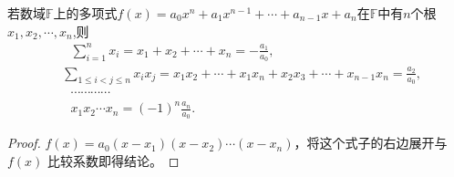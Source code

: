 \documentclass[../../main.tex]{subfiles}%
\begin{document}
\begin{theorem}[Vieta定理]\label{theorem:Vieta定理}
若数域\(\mathbb{F}\)上的多项式\(f(x)=a_0x^n + a_1x^{n - 1}+\cdots + a_{n - 1}x + a_n\)在\(\mathbb{F}\)中有\(n\)个根\(x_1,x_2,\cdots,x_n\),则
\begin{align*}
&\,\,\,\, \sum_{i=1}^n{x_i}=x_1+x_2+\cdots +x_n=-\frac{a_1}{a_0},
\\
&\sum_{1\leqslant i<j\leqslant n}{x_ix_j}=x_1x_2+\cdots +x_1x_n+x_2x_3+\cdots +x_{n-1}x_n=\frac{a_2}{a_0},
\\
&\,\,\,\, \cdots \cdots \cdots \cdots 
\\
&\,\,\,\, x_1x_2\cdots x_n=(-1)^n\frac{a_n}{a_0}.
\end{align*}
\end{theorem}
\begin{proof}

$f(x) = a_0 (x - x_1)(x - x_2) \cdots (x - x_n)$，将这个式子的右边展开与 $f(x)$ 比较系数即得结论。

\end{proof}
\end{document}
